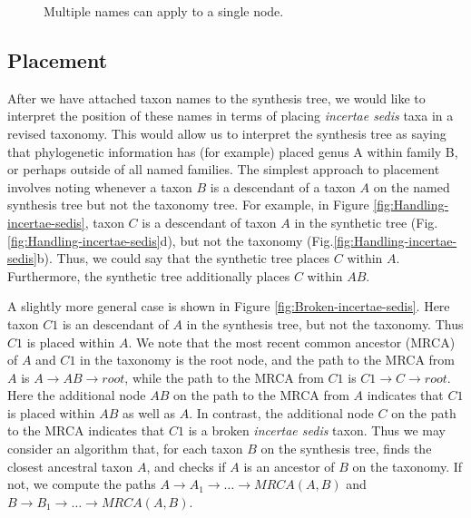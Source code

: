 \documentclass[english]{article}
\begin{document}
\begin{figure}
\hfill{}
\hfill{}
\caption{\label{fig:Multiple-names-can}Multiple names can apply to a single node.}
\end{figure}

\emph{}

\subsection{Placement}\label{subsec:Placement}

After we have attached taxon names to the synthesis tree, we would
like to interpret the position of these names in terms of placing
\emph{incertae sedis }taxa in a revised taxonomy.
This would allow us
to interpret the synthesis tree as saying that phylogenetic
information has (for example) placed genus A within family B, or
perhaps outside of all named families.
The simplest approach to
placement involves noting whenever a taxon $B$ is a descendant of a
taxon $A$ on the named synthesis tree but not the taxonomy tree.
For
example, in Figure \ref{fig:Handling-incertae-sedis}, taxon $C$ is a
descendant of taxon $A$ in the synthetic tree 
(Fig.\ref{fig:Handling-incertae-sedis}d), but not the taxonomy 
(Fig.\ref{fig:Handling-incertae-sedis}b).
Thus, we could say that the synthetic tree places
$C$ within $A$. Furthermore, the synthetic tree additionally places
$C$ within $AB$.

A slightly more general case is shown in 
Figure \ref{fig:Broken-incertae-sedis}.
Here taxon $C1$ is an descendant of $A$ in the
synthesis tree, but not the taxonomy.
Thus $C1$ is placed within $A$.
We note that the most recent common ancestor (MRCA) of $A$ and $C1$ in
the taxonomy is the root node, and the path to the MRCA from $A$ is
$A\to AB\to root$, while the path to the MRCA from $C1$ is $C1\to C\to
root$.
Here the additional node $AB$ on the path to the MRCA from $A$
indicates that $C1$ is placed within $AB$ as well as $A$.
In contrast,
the additional node $C$ on the path to the MRCA indicates that $C1$ is
a broken \emph{incertae sedis} taxon.
Thus we may consider an
algorithm that, for each taxon $B$ on the synthesis tree, finds the
closest ancestral taxon $A$, and checks if $A$ is an ancestor of $B$
on the taxonomy.
If not, we compute the paths $A\to A_{1}\to\ldots\to
MRCA(A,B)$ and $B\to B_{1}\to\ldots\to MRCA(A,B)$.
\end{document}

